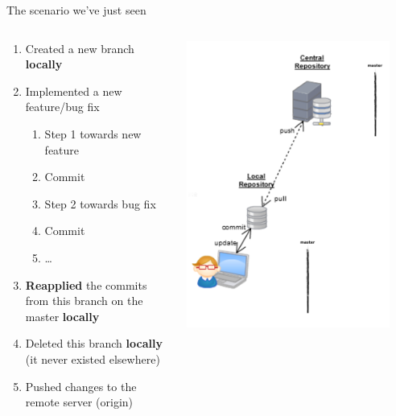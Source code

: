 \begin{frame}[fragile]{The scenario we've just seen}
\begin{columns}
\begin{column}{0.6\textwidth}
	\tiny
	\begin{enumerate}
		\item<2> Created a new branch \textbf{locally}
		\item<3-4> Implemented a new feature/bug fix
		\begin{enumerate}
			\tiny
			\item<3> Step 1 towards new feature
			\item<3> Commit
			\item<4> Step 2 towards bug fix
			\item<4> Commit
			\item<4> \ldots
		\end{enumerate}
		\item<5> \textbf{Reapplied} the commits from this branch on the master \textbf{locally}
		\item<6> Deleted this branch \textbf{locally} (it never existed elsewhere)
		\item<7> Pushed changes to the remote server (origin)
	\end{enumerate}
\end{column}
\begin{column}{0.4\textwidth}
	\begin{center}
			 {
				\includegraphics[width=0.9\textwidth]{branch_a.png}
}
\end{center}
\end{column}
\end{columns}
\end{frame}
